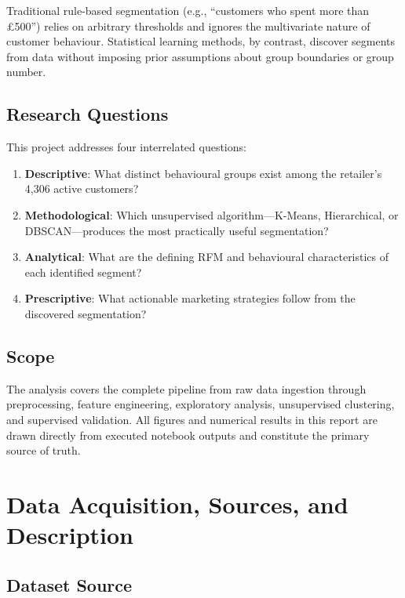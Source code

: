 \documentclass[10pt,a4paper]{article}
\begin{document}
Traditional rule-based segmentation (e.g., ``customers who spent more than \pounds500'')
relies on arbitrary thresholds and ignores the multivariate nature of customer behaviour.
Statistical learning methods, by contrast, discover segments from data without imposing
prior assumptions about group boundaries or group number.

\subsection{Research Questions}

This project addresses four interrelated questions:
\begin{enumerate}[leftmargin=*]
  \item \textbf{Descriptive}: What distinct behavioural groups exist among the retailer's
        4,306 active customers?
  \item \textbf{Methodological}: Which unsupervised algorithm---K-Means, Hierarchical, or
        DBSCAN---produces the most practically useful segmentation?
  \item \textbf{Analytical}: What are the defining RFM and behavioural characteristics of
        each identified segment?
  \item \textbf{Prescriptive}: What actionable marketing strategies follow from the
        discovered segmentation?
\end{enumerate}

\subsection{Scope}

The analysis covers the complete pipeline from raw data ingestion through preprocessing,
feature engineering, exploratory analysis, unsupervised clustering, and supervised
validation.  All figures and numerical results in this report are drawn directly from
executed notebook outputs and constitute the primary source of truth.

\section{Data Acquisition, Sources, and Description}

\subsection{Dataset Source}
\end{document}

